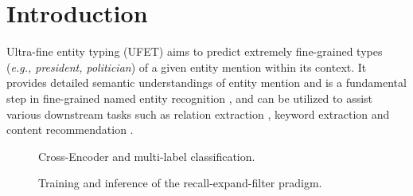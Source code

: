 \section{Introduction}
Ultra-fine entity typing (UFET) \cite{ufet} aims to predict extremely fine-grained types ({\it e.g., president, politician}) of a given entity mention within its context. It provides detailed semantic understandings of entity mention and is a fundamental step in fine-grained named entity recognition \cite{fget}, and can be utilized to assist various downstream tasks such as relation extraction \cite{fewrel}, keyword extraction \cite{huang2020ner} and content recommendation \cite{upadhyay2021explainable}.

\begin{figure}
    \centering
    \caption{Cross-Encoder and multi-label classification.}
    \label{fig:mlc_ce}
\end{figure}

\begin{figure}[t]
    \centering
    \caption{Training and inference of the recall-expand-filter pradigm.}
    \label{fig:paradigm}
\end{figure}

